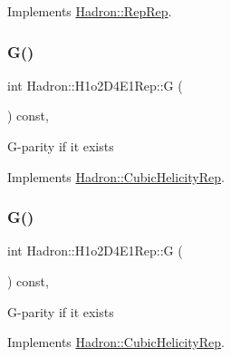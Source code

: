 Implements \mbox{\hyperlink{structHadron_1_1RepRep_a92c8802e5ed7afd7da43ccfd5b7cd92b}{Hadron\+::\+Rep\+Rep}}.

\mbox{\label{structHadron_1_1H1o2D4E1Rep_a89d088da502c7cd8faeecc24caebcc97}} 
\subsubsection{\texorpdfstring{G()}{G()}\hspace{0.1cm}{\footnotesize\ttfamily [1/3]}}
{\footnotesize\ttfamily int Hadron\+::\+H1o2\+D4\+E1\+Rep\+::G (\begin{DoxyParamCaption}{ }\end{DoxyParamCaption}) const\hspace{0.3cm}{\ttfamily [inline]}, {\ttfamily [virtual]}}

G-\/parity if it exists 

Implements \mbox{\hyperlink{structHadron_1_1CubicHelicityRep_a50689f42be1e6170aa8cf6ad0597018b}{Hadron\+::\+Cubic\+Helicity\+Rep}}.

\mbox{\label{structHadron_1_1H1o2D4E1Rep_a89d088da502c7cd8faeecc24caebcc97}} 
\subsubsection{\texorpdfstring{G()}{G()}\hspace{0.1cm}{\footnotesize\ttfamily [2/3]}}
{\footnotesize\ttfamily int Hadron\+::\+H1o2\+D4\+E1\+Rep\+::G (\begin{DoxyParamCaption}{ }\end{DoxyParamCaption}) const\hspace{0.3cm}{\ttfamily [inline]}, {\ttfamily [virtual]}}

G-\/parity if it exists 

Implements \mbox{\hyperlink{structHadron_1_1CubicHelicityRep_a50689f42be1e6170aa8cf6ad0597018b}{Hadron\+::\+Cubic\+Helicity\+Rep}}.

\mbox{\label{structHadron_1_1H1o2D4E1Rep_a89d088da502c7cd8faeecc24caebcc97}} 
